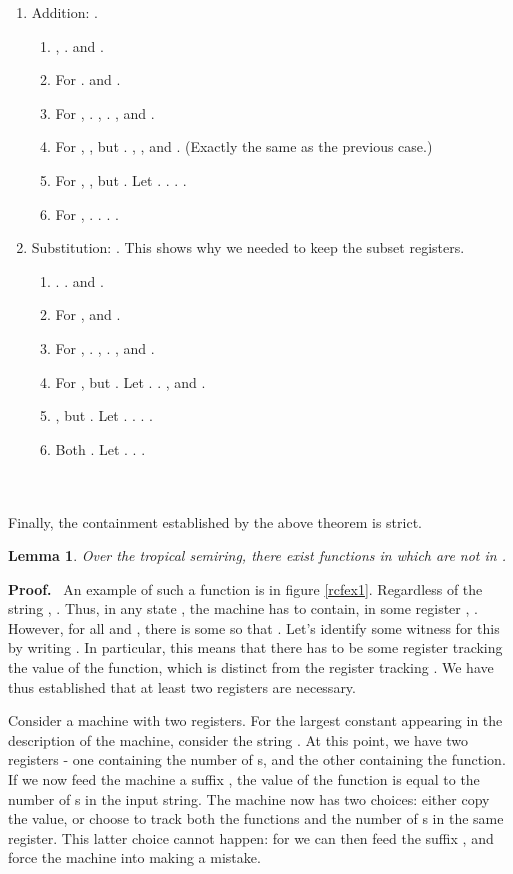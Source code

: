 \documentclass[11pt]{article}
\newtheorem{lemma}[theorem]{Lemma}
\def\Proof{{\bf Proof.}}
\def\qed{{\bf }}
\def\qed{{\bf }}
\begin{document}
\begin{enumerate}
\item Addition: .

\begin{enumerate}
\item , . 
and .
\item For .  and .
\item For , . , .
, and .
\item For , , but . , ,
and . (Exactly the same as the previous case.)
\item For , , but . Let .
.
.
.
\item For , . .
.
.
\end{enumerate}
\item Substitution: . This shows why we needed to keep the subset
registers.

\begin{enumerate}
\item .
. 
and .
\item For ,  and .
\item For , . , .
, and .
\item For ,  but . Let .
.
, and .
\item , but . Let .
.
.
.
\item Both . Let .
.
.\end{enumerate}
\end{enumerate}
\qed\\\\
Finally, the containment established by the above theorem is strict.

\begin{lemma}
Over the tropical semiring, there exist functions in  which are not in .
\end{lemma}
\Proof~
An example of such a function is  in figure \ref{rcfex1}.
Regardless of the string , .
Thus, in any state , the machine has to contain, in some register
, . However, for all  and
, there is some  so that .
Let's identify some witness for this by writing .
In particular, this means that there has to be some register tracking
the value of the function, which is distinct from the register 
tracking . We have thus established that at least
two registers are necessary.

Consider a machine with two registers. For the largest constant 
appearing in the description of the machine, consider the string .
At this point, we have two registers - one containing the number of
s, and the other containing the function. If we now feed the machine
a suffix , the value
of the function is equal to the number of s in the input string.
The machine now has two choices: either copy the value, or choose
to track both the functions and the number of s in the same register.
This latter choice cannot happen: for we can then feed the suffix
,
and force the machine into making a mistake.
\end{document}
